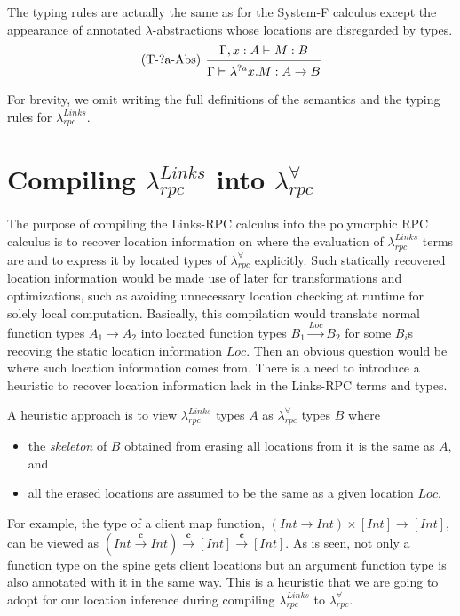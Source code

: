 \documentclass[a4paper]{article}
\theoremstyle{plain}
\theoremstyle{definition}
\newcommand{\polyrpc}{$\lambda_{rpc}^{\forall}$\xspace}
\newcommand{\linksrpc}{$\lambda_{rpc}^{Links}$\xspace}
\newcommand{\client}{\textbf{c}}
\newcommand{\lamL}[3]{\lambda^{#1}#2.#3}
\newcommand{\funL}[1]{\xrightarrow{#1}}
\newcommand{\tyenv}{\Gamma}
\newcommand{\tyenvExt}[2]{\Gamma,#1:#2}
\newcommand{\typing}[4]{#1\vdash_{#2} #3 : #4}
\newcommand{\Loc}{Loc}
\begin{document}
The typing rules are actually the same as for the System-F calculus
except the appearance of annotated $\lambda$-abstractions whose
locations are disregarded by types.
%
\[
\begin{prooftree}
  \hypo{ \typing{\tyenvExt{x}{A}}{}{M}{B} }
  \infer[left label=(T-?a-Abs)]1{ \typing{\tyenv}{}{\lamL{?a}{x}{M}}{A \rightarrow B} }
\end{prooftree}
\]

For brevity, we omit writing the full definitions of the semantics and
the typing rules for \linksrpc.

\section{Compiling \linksrpc into \polyrpc}
\label{sec:translationtopolyrpc}

The purpose of compiling the Links-RPC calculus into the polymorphic
RPC calculus is to recover location information on where the
evaluation of \linksrpc terms are and to express it by located types
of \polyrpc explicitly.
%
Such statically recovered location information would be made use of
later for transformations and optimizations, such as avoiding
unnecessary location checking at runtime for solely local computation.
%
Basically, this compilation would translate normal function types $A_1
\rightarrow A_2$ into located function types $B_1 \funL{\Loc} B_2$ for
some $B_i$s recoving the static location information $\Loc$.
%
Then an obvious question would be where such location information
comes from.
%
There is a need to introduce a heuristic to recover location
information lack in the Links-RPC terms and types.


A heuristic approach is to view \linksrpc types $A$ as \polyrpc types $B$ where
%
\begin{itemize}
  \item the {\it skeleton} of $B$ obtained from erasing all locations
    from it is the same as $A$, and
  \item all the erased locations are assumed to be the same as a given
    location $\Loc$.
\end{itemize}
%
For example, the type of a client map function, $(Int \rightarrow Int)
\times [Int] \rightarrow [Int]$, can be viewed as $(Int \funL{\client}
Int) \funL{\client} [Int] \funL{\client} [Int]$.
%
As is seen, not only a function type on the spine gets client
locations but an argument function type is also annotated with it in
the same way.
%
This is a heuristic that we are going to adopt for our location
inference during compiling \linksrpc to \polyrpc.
\end{document}

